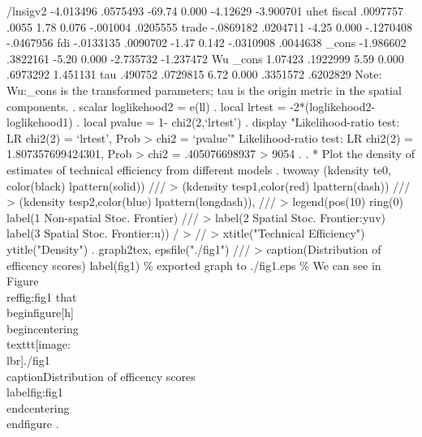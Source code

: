     /lnsigv2 {\VBAR}  -4.013496   .0575493   -69.74   0.000     -4.12629   -3.900701
uhet         {\VBAR}
      fiscal {\VBAR}   .0097757      .0055     1.78   0.076     -.001004    .0205555
       trade {\VBAR}  -.0869182   .0204711    -4.25   0.000    -.1270408   -.0467956
         fdi {\VBAR}  -.0133135   .0090702    -1.47   0.142    -.0310908    .0044638
       _cons {\VBAR}  -1.986602   .3822161    -5.20   0.000    -2.735732   -1.237472
Wu           {\VBAR}
       _cons {\VBAR}    1.07423   .1922999     5.59   0.000     .6973292    1.451131
         tau {\VBAR}    .490752   .0729815     6.72   0.000     .3351572    .6202829
Note: Wu:_cons is the transformed parameters;
      tau is the origin metric in the spatial components.
{\smallskip}
. scalar loglikehood2 =  e(ll)
{\smallskip}
. local lrtest = -2*(loglikehood2-loglikehood1)
{\smallskip}
. local pvalue = 1- chi2(2,`lrtest')
{\smallskip}
. display "Likelihood-ratio test: LR chi2(2) = `lrtest', Prob > chi2 = `pvalue'"
Likelihood-ratio test: LR chi2(2) = 1.807357699424301, Prob > chi2 = .405076698937
> 9054
{\smallskip}
. 
. * Plot the density of estimates of technical efficiency from different models
. twoway (kdensity te0, color(black) lpattern(solid)) ///
>        (kdensity tesp1,color(red) lpattern(dash))   ///
>            (kdensity tesp2,color(blue) lpattern(longdash)),  ///
>         legend(pos(10) ring(0) label(1 Non-spatial Stoc. Frontier) ///
>         label(2 Spatial Stoc. Frontier:yuv) label(3 Spatial Stoc. Frontier:u)) /
> //
>         xtitle("Technical Efficiency") ytitle("Density")
{\smallskip}
. graph2tex, epsfile("./fig1") ///
>            caption(Distribution of efficency scores) label(fig1)
\% exported graph to ./fig1.eps
\% We can see in Figure \\ref{\lbr}fig:fig1{\rbr} that
\\begin{\lbr}figure{\rbr}[h]
\\begin{\lbr}centering{\rbr}
  \\texttt{[image: \\lbr]}./fig1{\rbr}
  \\caption{\lbr}Distribution of efficency scores{\rbr}
  \\label{\lbr}fig:fig1{\rbr}
\\end{\lbr}centering{\rbr}
\\end{\lbr}figure{\rbr}
{\smallskip}
. 
